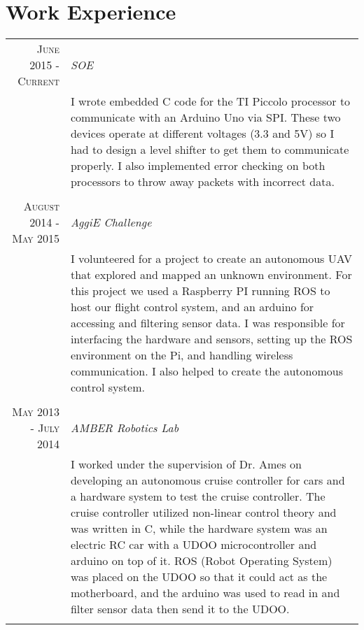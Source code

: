 \documentclass[a4paper,10pt]{article} %
\begin{document}

\section{Work Experience}

\begin{tabular}{r|p{11cm}}
\textsc{June 2015 - Current} & \emph{SOE}\\
& \footnotesize{I wrote embedded C code for the TI Piccolo processor to communicate with an Arduino Uno via SPI. These two devices operate at different
voltages (3.3 and 5V) so I had to design a level shifter to get them to communicate properly. I also implemented error checking on both processors to
throw away packets with incorrect data.}\\
\multicolumn{2}{c}{} \\


\textsc{August 2014 - May 2015} & \emph{AggiE Challenge}\\
& \footnotesize{I volunteered for a project to create an autonomous UAV that explored and mapped an unknown environment. For this project we used a Raspberry PI running ROS to host our flight control system, and an arduino for accessing and filtering sensor data. I was responsible for interfacing the hardware and sensors, setting up the ROS environment on the Pi, and handling wireless communication. I also helped to create the autonomous control system.}\\
\multicolumn{2}{c}{} \\


\textsc{May 2013 - July 2014} & \emph{AMBER Robotics Lab}\\
& \footnotesize{I worked under the supervision of Dr. Ames on developing an autonomous cruise controller for cars and a hardware system to test the cruise controller. The cruise controller utilized non-linear control theory and was written in C, while the hardware system was an electric RC car with a UDOO microcontroller and arduino on top of it. ROS (Robot Operating System) was placed on the UDOO so that it could act as the motherboard, and the arduino was used to read in and filter sensor data then send it to the UDOO.}\\
\multicolumn{2}{c}{} \\

\end{tabular}
\end{document}
